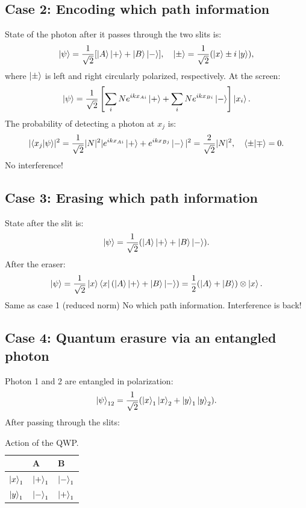 \subsection{Case 2: Encoding which path information}
State of the photon after it passes through the two slits is:
\begin{align*}
    \left|\psi\right\rangle=\frac{1}{\sqrt{2}}[\left|A\right\rangle\left|+\right\rangle+\left|B\right\rangle\left|-\right\rangle],\quad\left|\pm\right\rangle=\frac{1}{\sqrt{2}}(\left|x\right\rangle\pm i\left|y\right\rangle),
\end{align*}
where $\left|\pm\right\rangle$ is left and right circularly polarized, respectively.
At the screen:
\begin{align*}
    \left|\psi\right\rangle=\frac{1}{\sqrt{2}}\left[\sum_iNe^{ikx_{Ai}}\left|+\right\rangle+\sum_iNe^{ikx_{Bi}}\left|-\right\rangle\right]\left|x_i\right\rangle.
\end{align*}
The probability of detecting a photon at $x_j$ is:
\begin{align*}
    |\langle x_j|\psi\rangle|^2=\frac{1}{\sqrt{2}}|N|^2|e^{ikx_{Ai}}\left|+\right\rangle+e^{ikx_{Bj}}\left|-\right\rangle|^2=\frac{2}{\sqrt{2}}|N|^2,\quad\langle\pm|\mp\rangle=0.
\end{align*}
No interference!
\subsection{Case 3: Erasing which path information}
State after the slit is:
\begin{align*}
    \left|\psi\right\rangle=\frac{1}{\sqrt{2}}(\left|A\right\rangle\left|+\right\rangle+\left|B\right\rangle\left|-\right\rangle).
\end{align*}
After the eraser:
\begin{align*}
    \left|\psi\right\rangle=\frac{1}{\sqrt{2}}\left|x\right\rangle\left\langle x\right|(\left|A\right\rangle\left|+\right\rangle+\left|B\right\rangle\left|-\right\rangle)=\frac{1}{2}(\left|A\right\rangle+\left|B\right\rangle)\otimes\left|x\right\rangle.
\end{align*}
Same as case 1 (reduced norm) No which path information. Interference is back!
\subsection{Case 4: Quantum erasure via an entangled photon}
Photon 1 and 2 are entangled in polarization:
\begin{align*}
    \left|\psi\right\rangle_{12}=\frac{1}{\sqrt{2}}(\left|x\right\rangle_1\left|x\right\rangle_2+\left|y\right\rangle_1\left|y\right\rangle_2).
\end{align*}
After passing through the slits:
\begin{table}[H]
    \centering
    \caption{Action of the QWP.}
    \begin{tabular}{l|ll}
        &A&B\\
        \hline
        $\left|x\right\rangle_1$&$\left|+\right\rangle_1$&$\left|-\right\rangle_1$\\
        $\left|y\right\rangle_1$&$\left|-\right\rangle_1$&$\left|+\right\rangle_1$
    \end{tabular}
\end{table}

